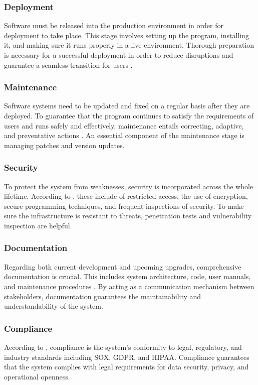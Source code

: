 \subsubsection{Deployment}
\par{Software must be released into the production environment in order for deployment to take place. This stage involves setting up the program, installing it, and making sure it runs properly in a live environment. Thorough preparation is necessary for a successful deployment in order to reduce disruptions and guarantee a seamless transition for users \citep{sommerville2011software}.}
\subsubsection{Maintenance}
\par{Software systems need to be updated and fixed on a regular basis after they are deployed. To guarantee that the program continues to satisfy the requirements of users and runs safely and effectively, maintenance entails correcting, adaptive, and preventative actions \citep{pressman2005software}. An essential component of the maintenance stage is managing patches and version updates.}
\subsubsection{Security}
\par{To protect the system from weaknesses, security is incorporated across the whole lifetime. According to \cite{goodrich2011introduction}, these include of restricted access, the use of encryption, secure programming techniques, and frequent inspections of security. To make sure the infrastructure is resistant to threats, penetration tests and vulnerability inspection are helpful.}
\subsubsection{Documentation}
\par{Regarding both current development and upcoming upgrades, comprehensive documentation is crucial. This includes system architecture, code, user manuals, and maintenance procedures \citep{doe2011recommended}. By acting as a communication mechanism between stakeholders, documentation guarantees the maintainability and understandability of the system.}
\subsubsection{Compliance}
\par{According to \cite{sommerville2011software}, compliance is the system's conformity to legal, regulatory, and industry standards including SOX, GDPR, and HIPAA. Compliance guarantees that the system complies with legal requirements for data security, privacy, and operational openness.}
